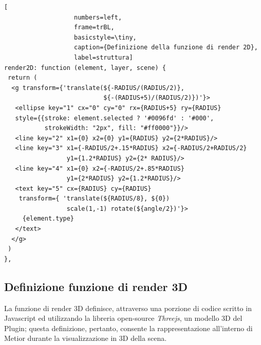 \begin{lstlisting}[
                   numbers=left,
                   frame=trBL,
                   basicstyle=\tiny,
                   caption={Definizione della funzione di render 2D},
                   label=struttura]
render2D: function (element, layer, scene) {
 return (
  <g transform={'translate(${-RADIUS/(RADIUS/2)},
                           ${-(RADIUS+5)/(RADIUS/2)})'}>
   <ellipse key="1" cx="0" cy="0" rx={RADIUS+5} ry={RADIUS}
   style={{stroke: element.selected ? '#0096fd' : '#000',
           strokeWidth: "2px", fill: "#ff0000"}}/>
   <line key="2" x1={0} x2={0} y1={RADIUS} y2={2*RADIUS}/>
   <line key="3" x1={-RADIUS/2+.15*RADIUS} x2={-RADIUS/2+RADIUS/2}
                 y1={1.2*RADIUS} y2={2* RADIUS}/>
   <line key="4" x1={0} x2={-RADIUS/2+.85*RADIUS}
                 y1={2*RADIUS} y2={1.2*RADIUS}/>
   <text key="5" cx={RADIUS} cy={RADIUS}
    transform={ 'translate(${RADIUS/8}, ${0})
                 scale(1,-1) rotate(${angle/2})'}>
     {element.type}
   </text>
  </g>
 )
},
\end{lstlisting}
\newpage

\subsection{Definizione funzione di render 3D}
La funzione di render 3D definisce, attraverso una porzione di codice scritto in Javascript ed utilizzando
la libreria open-source \emph{Threejs}, un modello 3D del Plugin;
questa definizione, pertanto, consente la rappresentazione all'interno di Metior durante la visualizzazione in 3D della scena.\\


